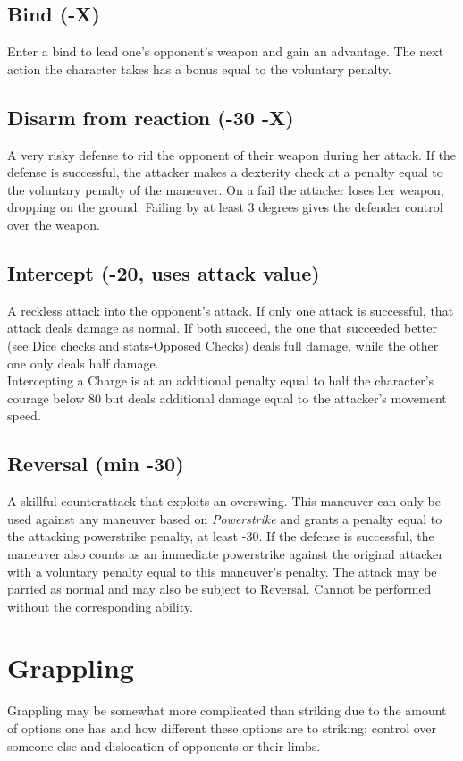 \subsection*{Bind (-X)}
Enter a bind to lead one’s opponent’s weapon and gain an advantage. The next action the character takes has a bonus equal to the voluntary penalty.
\subsection*{Disarm from reaction (-30 -X)}
A very risky defense to rid the opponent of their weapon during her attack. If the defense is successful, the attacker makes a dexterity check at a penalty equal to the voluntary penalty of the maneuver. On a fail the attacker loses her weapon, dropping on the ground. Failing by at least 3 degrees gives the defender control over the weapon.
\subsection*{Intercept (-20, uses attack value)}
A reckless attack into the opponent's attack. If only one attack is successful, that attack deals damage as normal. If both succeed, the one that succeeded better (see Dice checks and stats-Opposed Checks) deals full damage, while the other one only deals half damage.\\
Intercepting a Charge is at an additional penalty equal to half the character’s courage below 80 but deals additional damage equal to the attacker’s movement speed.
\subsection*{Reversal (min -30)}
A skillful counterattack that exploits an overswing. This maneuver can only be used against any maneuver based on \emph{Powerstrike} and grants a penalty equal to the attacking powerstrike penalty, at least -30. If the defense is successful, the maneuver also counts as an immediate powerstrike against the original attacker with a voluntary penalty equal to this maneuver’s penalty. The attack may be parried as normal and may also be subject to Reversal. Cannot be performed without the corresponding ability.

\section{Grappling}
Grappling may be somewhat more complicated than striking due to the amount of options one has and how different these options are to striking: control over someone else and dislocation of opponents or their limbs.
